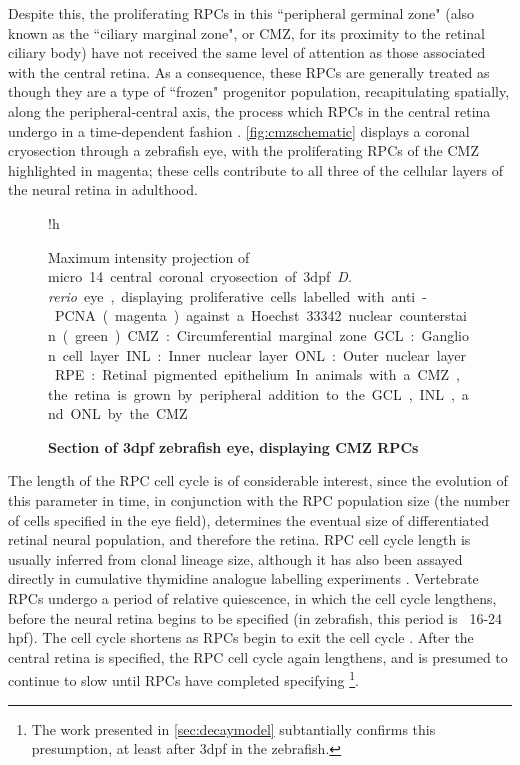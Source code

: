 Despite this, the proliferating RPCs in this ``peripheral germinal zone" (also known as the ``ciliary marginal zone", or CMZ, for its proximity to the retinal ciliary body) have not received the same level of attention as those associated with the central retina. As a consequence, these RPCs are generally treated as though they are a type of ``frozen" progenitor population, recapitulating spatially, along the peripheral-central axis, the process which RPCs in the central retina undergo in a time-dependent fashion \cite{Harris1998}. \autoref{fig:cmzschematic} displays a coronal cryosection through a zebrafish eye, with the proliferating RPCs of the CMZ highlighted in magenta; these cells contribute to all three of the cellular layers of the neural retina in adulthood.

\begin{figure}{!h}
  \caption{\bf{Section of 3dpf zebrafish eye, displaying CMZ RPCs}} Maximum intensity projection of \SI{14}[micro][metre] central coronal cryosection of 3dpf \textit{D. rerio} eye, displaying proliferative cells labelled with anti-PCNA (magenta) against a Hoechst 33342 nuclear counterstain (green). CMZ: Circumferential marginal zone. GCL: Ganglion cell layer. INL: Inner nuclear layer. ONL: Outer nuclear layer. RPE: Retinal pigmented epithelium. In animals with a CMZ, the retina is grown by peripheral addition to the GCL, INL, and ONL by the CMZ. 
  \label{fig:cmzschematic}
\end{figure}

The length of the RPC cell cycle is of considerable interest, since the evolution of this parameter in time, in conjunction with the RPC population size (the number of cells specified in the eye field), determines the eventual size of differentiated retinal neural population, and therefore the retina. RPC cell cycle length is usually inferred from clonal lineage size, although it has also been assayed directly in cumulative thymidine analogue labelling experiments \cite{Alexiades1996}. Vertebrate RPCs undergo a period of relative quiescence, in which the cell cycle lengthens, before the neural retina begins to be specified (in zebrafish, this period is ~16-24 hpf). The cell cycle shortens as RPCs begin to exit the cell cycle \cite{Harris1991,Li2000}. After the central retina is specified, the RPC cell cycle again lengthens, and is presumed to continue to slow until RPCs have completed specifying \footnote{The work presented in \autoref{sec:decaymodel} subtantially confirms this presumption, at least after 3dpf in the zebrafish.}.


